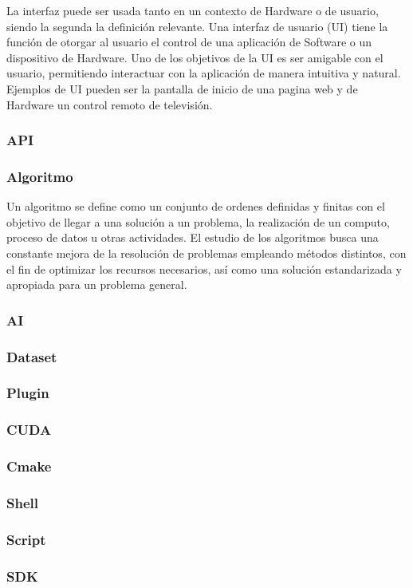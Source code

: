 La interfaz puede ser usada tanto en un contexto de Hardware o de usuario, siendo la segunda la definición relevante.
Una interfaz de usuario (UI) tiene la función de otorgar al usuario el control de una aplicación de Software o un dispositivo de Hardware. Uno de los objetivos de la UI es ser amigable con el usuario, permitiendo interactuar con la aplicación de manera intuitiva y natural. Ejemplos de UI pueden ser la pantalla de inicio de una pagina web y de Hardware un control remoto de televisión.

\subsubsection{API}

\subsubsection{Algoritmo}

Un algoritmo se define como un conjunto de ordenes definidas y finitas con el objetivo de llegar a una solución a un problema, la realización de un computo, proceso de datos u otras actividades. El estudio de los algoritmos busca una constante mejora de la resolución de problemas empleando métodos distintos, con el fin de optimizar los recursos necesarios, así como una solución estandarizada y apropiada para un problema general.

\subsubsection{AI}
\subsubsection{Dataset}
\subsubsection{Plugin}
\subsubsection{CUDA}
\subsubsection{Cmake}
\subsubsection{Shell}
\subsubsection{Script}
\subsubsection{SDK}


